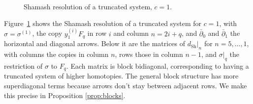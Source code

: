 \documentclass[12pt]{amsart}
\theoremstyle{plain}
\theoremstyle{definition}
\newcommand{\Sh}{\mathrm{Sh}}
\newcommand{\shent}[2]{{\setlength{\fboxsep}{1.5pt}\colorbox{#1}{$\vphantom{\sigma_{10}}#2$}}}
\begin{document}
\begin{figure}[h]
{}
    \caption{Shamash resolution of a truncated system, $c=1$.}
    \label{fig:Sham1}
\end{figure}

Figure~\ref{fig:Sham1} shows the Shamash resolution of a truncated system for $c=1$, with $\sigma = \sigma^{(1)}$, the copy $y_1^{(i)} F_q$ in row $i$ and column $n = 2i + q$, and $\bar\partial_0$ and $\bar\partial_1$ the horizontal and diagonal arrows. Below it are the matrices of $d_{\Sh}|_n$ for $n = 5, \dots, 1$, with columns the copies in column $n$, rows those in column $n - 1$, and $\sigma|_q$ the restriction of $\sigma$ to $F_q$. Each matrix is block bidiagonal, corresponding to having a truncated system of higher homotopies. The general block structure has more superdiagonal terms because arrows don't stay between adjacent rows. We make this precise in Proposition \ref{prop:blocks}.
\end{document}
